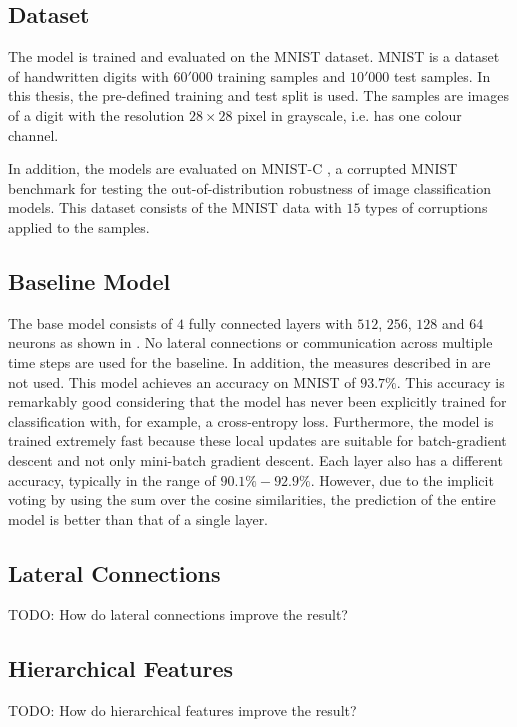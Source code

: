 \subsection{Dataset}
The model is trained and evaluated on the MNIST \cite{Lecun_Bottou_Bengio_Haffner_1998} dataset. MNIST is a dataset of handwritten digits with $60'000$ training samples and $10'000$ test samples.
In this thesis, the pre-defined training and test split is used.
The samples are images of a digit with the resolution $28 \times 28$ pixel in grayscale, i.e. has one colour channel.

In addition, the models are evaluated on MNIST-C , a corrupted MNIST benchmark for testing the out-of-distribution robustness of image classification models. This dataset consists of the MNIST data with $15$ types of corruptions applied to the samples.

\subsection{Baseline Model}
The base model consists of $4$ fully connected layers with $512$, $256$, $128$ and $64$ neurons as shown in .
No lateral connections or communication across multiple time steps are used for the baseline. In addition, the measures described in  are not used.
This model achieves an accuracy on MNIST of $93.7\%$. This accuracy is remarkably good considering that the model has never been explicitly trained for classification with, for example, a cross-entropy loss.
Furthermore, the model is trained extremely fast because these local updates are suitable for batch-gradient descent and not only mini-batch gradient descent.
Each layer also has a different accuracy, typically in the range of $90.1\% - 92.9\%$. However, due to the implicit voting by using the sum over the cosine similarities, the prediction of the entire model is better than that of a single layer.


\subsection{Lateral Connections}
TODO: How do lateral connections improve the result?


\subsection{Hierarchical Features}
TODO: How do hierarchical features improve the result?











